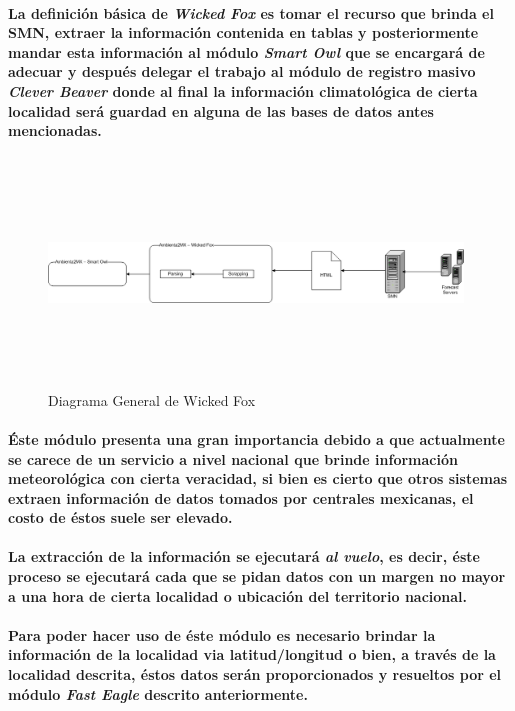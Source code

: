     \paragraph{ La definición básica de \textbf{\emph{Wicked Fox}} es tomar el recurso que brinda el SMN, extraer la información contenida en tablas y posteriormente mandar esta información al módulo \textbf{\emph{Smart Owl}} que se encargará de adecuar y después delegar el trabajo al módulo de registro masivo \textbf{\emph{Clever Beaver}} donde al final la información climatológica de cierta localidad será guardad en alguna de las bases de datos antes mencionadas.}
      \newpage
      \begin{landscape}
        \begin{figure}[h!]
        \centering
        \includegraphics[width=11cm,height=6cm]{./images/DiagramaWickedFox.png}
        \caption{Diagrama General de Wicked Fox}
      \end{figure}
      \end{landscape}
    \newpage
    \paragraph{Éste módulo presenta una gran importancia debido a que actualmente se carece de un servicio a nivel nacional que brinde información meteorológica con cierta veracidad, si bien es cierto que otros sistemas extraen información de datos tomados por centrales mexicanas, el costo de éstos suele ser elevado.}
    \paragraph{La extracción de la información se ejecutará \emph{al vuelo}, es decir, éste proceso se ejecutará cada que se pidan datos con un margen no mayor a una hora de cierta localidad o ubicación del territorio nacional.}
    \paragraph{Para poder hacer uso de éste módulo es necesario brindar la información de la localidad via latitud/longitud o bien, a través de la localidad descrita, éstos datos serán proporcionados y resueltos por el módulo \textbf{\emph{Fast Eagle}} descrito anteriormente.}